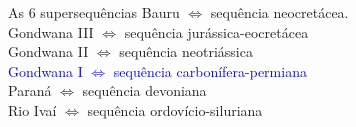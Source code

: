 \documentclass[aspectratio=10]{beamer} %
\begin{document}
\begin{frame}
\begin{columns}
\begin{column}{0.55\textwidth}
\begin{block}{As $6$ supersequências}
Bauru $\Longleftrightarrow$  sequência neocretácea.\\
Gondwana III $\Longleftrightarrow$ sequência jurássica-eocretácea\\
Gondwana II $\Longleftrightarrow$ sequência neotriássica \\
\textcolor{blue}{Gondwana I $\Longleftrightarrow$ sequência carbonífera-permiana}\\ 
Paraná $\Longleftrightarrow$ sequência devoniana\\
Rio Ivaí $\Longleftrightarrow$ sequência ordovício-siluriana\\
\cite{Vail_1977,assine_1994,milani_orogenias_1998}
\end{block}
\end{column}
\end{columns}
\end{frame}
\end{document}
